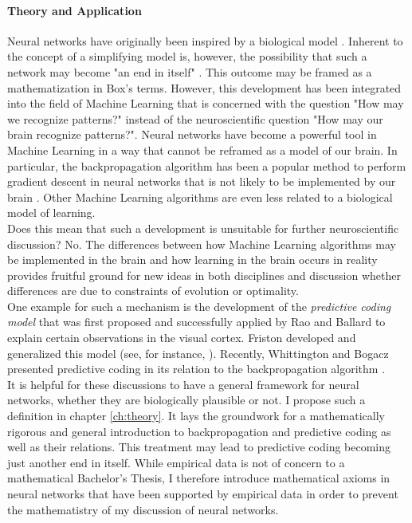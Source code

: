 \documentclass[a4paper,11pt]{report}
\begin{document}
\paragraph{Theory and Application}
Neural networks have originally been inspired by a biological model \cite{Rojas1996}. Inherent to the concept of a simplifying model is, however, the possibility that such a network may become "an end in itself" \cite[][1305]{Sejnowski1988}. This outcome may be framed as a mathematization in Box's terms. However, this development has been integrated into the field of Machine Learning that is concerned with the question "How may we recognize patterns?" instead of the neuroscientific question "How may our brain recognize patterns?". Neural networks have become a powerful tool in Machine Learning in a way that cannot be reframed as a model of our brain. In particular, the backpropagation algorithm has been a popular method to perform gradient descent in neural networks that is not likely to be implemented by our brain \cite{Liao2015}. Other Machine Learning algorithms are even less related to a biological model of learning.\\
Does this mean that such a development is unsuitable for further neuroscientific discussion? No. The differences between how Machine Learning algorithms may be implemented in the brain and how learning in the brain occurs in reality provides fruitful ground for new ideas in both disciplines and discussion whether differences are due to constraints of evolution or optimality.\\
One example for such a mechanism is the development of the \emph{predictive coding model} that was first proposed and successfully applied by Rao and Ballard \cite{Rao1999} to explain certain observations in the visual cortex. Friston developed and generalized this model (see, for instance, \cite{Friston2005}). Recently, Whittington and Bogacz presented predictive coding in its relation to the backpropagation algorithm \cite{Whittington2017}.\\
It is helpful for these discussions to have a general framework for neural networks, whether they are biologically plausible or not. I propose such a definition in chapter \ref{ch:theory}. It lays the groundwork for a mathematically rigorous and general introduction to backpropagation and predictive coding as well as their relations. This treatment may lead to predictive coding becoming just another end in itself. While empirical data is not of concern to a mathematical Bachelor's Thesis, I therefore introduce mathematical axioms in neural networks that have been supported by empirical data in order to prevent the mathematistry of my discussion of neural networks.
\end{document}
